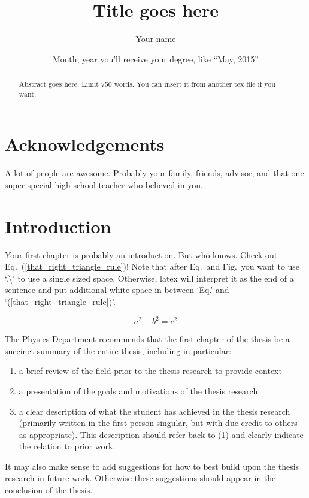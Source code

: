 \documentclass[letterpaper,11pt]{yalephd}
\title{Title goes here}
\author{Your name}
\date{Month, year you'll receive your degree, like ``May, 2015''} %
\begin{document}
\frontmatter

\begin{abstract}
Abstract goes here. Limit 750 words. You can insert it from another tex file if you want.
\end{abstract}

\maketitle
\makecopyright{\printyear} %
\tableofcontents
\listoffigures %
\listoftables %


\chapter{Acknowledgements} %
A lot of people are awesome. Probably your family, friends, 
advisor, and that one super special high school teacher who
believed in you.

\mainmatter

\chapter{Introduction}
Your first chapter is probably an introduction. But who knows. Check out Eq.\ (\ref{that_right_triangle_rule})!
Note that after Eq.\ and Fig.\ you want to use `.\textbackslash'  to use a single sized space. Otherwise,
latex will interpret it as the end of a sentence and put additional white space in between `Eq.' and 
`(\ref{that_right_triangle_rule})'.

\begin{equation}
a^2 + b^2 = c^2 \label{that_right_triangle_rule}
\end{equation}

The Physics Department recommends that the first chapter of the thesis be 
a succinct summary of the entire thesis, including in particular:

\begin{enumerate}
  \item a brief review of the field prior to the thesis research to provide context
  \item a presentation of the goals and motivations of the thesis research 
  \item a clear description of what the student has achieved in the thesis research
 (primarily written in the first person singular, but with due credit to
 others as appropriate). This description should refer back to (1) and clearly indicate the relation
 to prior work.
\end{enumerate}
It may also make sense to add suggestions for how to best build upon the thesis research in future work. Otherwise these suggestions should appear in the conclusion of the thesis.
\end{document}
